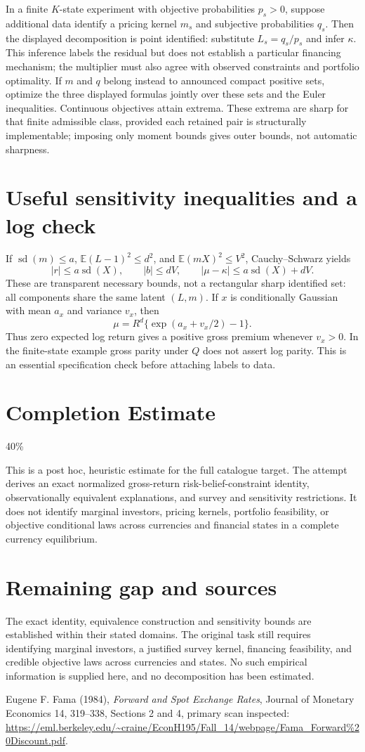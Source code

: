 \documentclass[11pt]{article}
\begin{document}
In a finite $K$-state experiment with objective probabilities $p_s>0$, suppose additional data identify a pricing kernel $m_s$ and subjective probabilities $q_s$. Then the displayed decomposition is point identified: substitute $L_s=q_s/p_s$ and infer $\kappa$. This inference labels the residual but does not establish a particular financing mechanism; the multiplier must also agree with observed constraints and portfolio optimality. If $m$ and $q$ belong instead to announced compact positive sets, optimize the three displayed formulas jointly over these sets and the Euler inequalities. Continuous objectives attain extrema. These extrema are sharp for that finite admissible class, provided each retained pair is structurally implementable; imposing only moment bounds gives outer bounds, not automatic sharpness.

\section{Useful sensitivity inequalities and a log check}
If $\operatorname{sd}(m)\leq a$, $\mathbb E(L-1)^2\leq d^2$, and $\mathbb E(mX)^2\leq V^2$, Cauchy--Schwarz yields
\[
 |r|\leq a\operatorname{sd}(X),\qquad |b|\leq dV,
 \qquad |\mu-\kappa|\leq a\operatorname{sd}(X)+dV.
\]
These are transparent necessary bounds, not a rectangular sharp identified set: all components share the same latent $(L,m)$.
If $x$ is conditionally Gaussian with mean $a_x$ and variance $v_x$, then
\[
 \mu=R^d\{\exp(a_x+v_x/2)-1\}.
\]
Thus zero expected log return gives a positive gross premium whenever $v_x>0$. In the finite-state example gross parity under $Q$ does not assert log parity. This is an essential specification check before attaching labels to data.

\section{Completion Estimate}
40\%

This is a post hoc, heuristic estimate for the full catalogue target.
The attempt derives an exact normalized gross-return risk-belief-constraint identity, observationally equivalent explanations, and survey and sensitivity restrictions. It does not identify marginal investors, pricing kernels, portfolio feasibility, or objective conditional laws across currencies and financial states in a complete currency equilibrium.

\section{Remaining gap and sources}
The exact identity, equivalence construction and sensitivity bounds are established within their stated domains. The original task still requires identifying marginal investors, a justified survey kernel, financing feasibility, and credible objective laws across currencies and states. No such empirical information is supplied here, and no decomposition has been estimated.

Eugene F. Fama (1984), \emph{Forward and Spot Exchange Rates}, Journal of Monetary Economics 14, 319--338, Sections 2 and 4, primary scan inspected:
\url{https://eml.berkeley.edu/~craine/EconH195/Fall_14/webpage/Fama_Forward%20Discount.pdf}.
\end{document}
